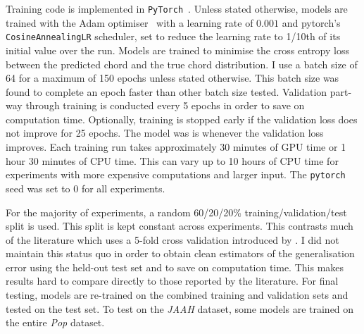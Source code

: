 Training code is implemented in \texttt{PyTorch}~\citep{pytorch}. Unless stated otherwise, models are trained with the Adam optimiser~\citep{adam} with a learning rate of $0.001$ and pytorch's \texttt{CosineAnnealingLR} scheduler, set to reduce the learning rate to 1/10th of its initial value over the run. Models are trained to minimise the cross entropy loss between the predicted chord and the true chord distribution. I use a batch size of 64 for a maximum of 150 epochs unless stated otherwise. This batch size was found to complete an epoch faster than other batch size tested. Validation part-way through training is conducted every 5 epochs in order to save on computation time. Optionally, training is stopped early if the validation loss does not improve for 25 epochs. The model was is whenever the validation loss improves. Each training run takes approximately 30 minutes of GPU time or 1 hour 30 minutes of CPU time. This can vary up to 10 hours of CPU time for experiments with more expensive computations and larger input. The \texttt{pytorch} seed was set to $0$ for all experiments. 

For the majority of experiments, a random 60/20/20\% training/validation/test split is used. This split is kept constant across experiments. This contrasts much of the literature which uses a 5-fold cross validation introduced by \citet{FourTimelyInsights}. I did not maintain this status quo in order to obtain clean estimators of the generalisation error using the held-out test set and to save on computation time. This makes results hard to compare directly to those reported by the literature. For final testing, models are re-trained on the combined training and validation sets and tested on the test set. To test on the \emph{JAAH} dataset, some models are trained on the entire \emph{Pop} dataset.